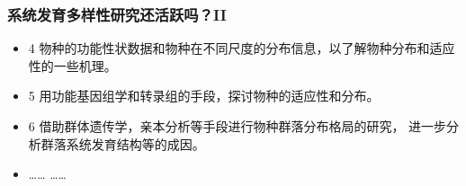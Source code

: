 \documentclass[UTF8]{ctexbeamer}
\begin{document}
\begin{frame}
\frametitle{系统发育多样性研究还活跃吗？II}
\begin{itemize}
\item 4 物种的功能性状数据和物种在不同尺度的分布信息，以了解物种分布和适应性的一些机理。 \\
\item 5 用功能基因组学和转录组的手段，探讨物种的适应性和分布。 \\
\item 6 借助群体遗传学，亲本分析等手段进行物种群落分布格局的研究， 进一步分析群落系统发育结构等的成因。\\
\item …… ……
\end{itemize}
\end{frame}

\end{document}
